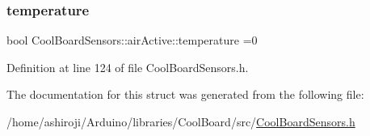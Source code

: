 \subsubsection{\texorpdfstring{temperature}{temperature}}
{\footnotesize\ttfamily bool Cool\+Board\+Sensors\+::air\+Active\+::temperature =0}



Definition at line 124 of file Cool\+Board\+Sensors.\+h.



The documentation for this struct was generated from the following file\+:\begin{DoxyCompactItemize}
\item 
/home/ashiroji/\+Arduino/libraries/\+Cool\+Board/src/\hyperlink{_cool_board_sensors_8h}{Cool\+Board\+Sensors.\+h}\end{DoxyCompactItemize}
